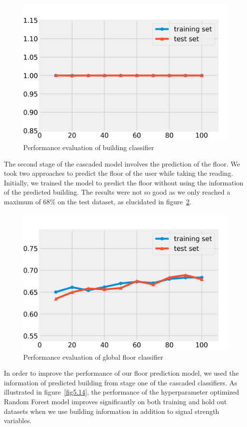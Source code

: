 \documentclass[a4paper,singleside,12pt]{report} %
\begin{document}
			
			\begin{figure}[!htb]
				\centering
				\includegraphics[width=0.8\linewidth]{./figures/plot_learning_curves_building_classification.png}
				\caption{Performance evaluation of  building classifier}
				 \label{fig5.12}
			\end{figure}
			
			The second stage of the cascaded model involves the prediction of the floor. 
			We took two approaches to predict the floor of the user while taking the reading. 
			Initially, we trained the model to predict the floor without using the information of the predicted building. 
			The results were not so good as we only reached a maximum of 68\% on the test dataset, as elucidated in figure~\ref{fig5.13}.
			
			\begin{figure}[!htb]
				\centering
				\includegraphics[width=0.8\linewidth]{./figures/plot_learning_curves_global_floor_classification.png}
				\caption{Performance evaluation of global floor classifier}
				 \label{fig5.13}
			\end{figure}
			
			In order to improve the performance of our floor prediction model, we used the information of predicted building from stage one of the cascaded classifiers. 
			As illustrated in figure~\ref{fig5.14}, the performance of the hyperparameter optimized Random Forest model improves significantly on both training and hold out datasets when we use building information in addition to signal strength variables. 
			
\end{document}
